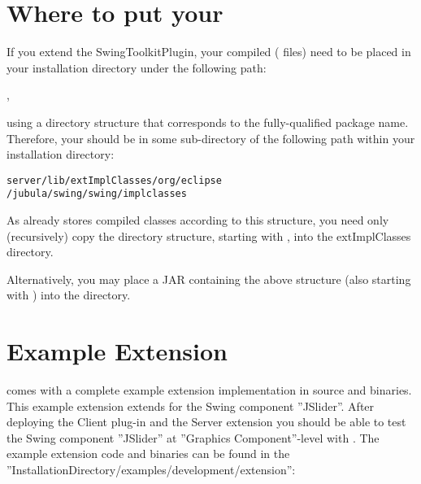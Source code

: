 \section{Where to put your \gdtesterclasses}
If you extend the SwingToolkitPlugin, your compiled \gdtesterclasses ( files) need to
be placed in your \app{} installation directory under the following path:

 ,

using a directory structure that corresponds to the fully-qualified
package name. Therefore, your \gdtesterclasses should be in some
sub-directory of the following path within your \app{} installation directory:

\texttt{server/lib/extImplClasses/org/eclipse\\
    /jubula/swing/swing/implclasses}

As  already stores compiled classes according to this
structure, you need only (recursively) copy the directory structure,
starting with , into the extImplClasses directory.

Alternatively, you may place a JAR containing the above structure
(also starting with ) into the 
directory.


\section{\app{} Example Extension}
\app{} comes with a complete example extension implementation in source and binaries. 
This example extension extends \app{} for the Swing component ''JSlider''. After deploying the \app{} Client plug-in and the \app{} Server 
extension you should be able to test the Swing component ''JSlider'' at ''Graphics Component''-level with \app{}.
The example extension code and binaries can be found in the ''InstallationDirectory/examples/development/extension'':

